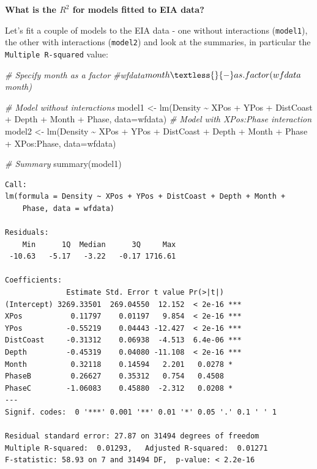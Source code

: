 \documentclass[
  oneside]{krantz}
\newenvironment{Shaded}{\begin{snugshade}}{\end{snugshade}}
\newcommand{\AttributeTok}[1]{\textcolor[rgb]{0.77,0.63,0.00}{#1}}
\newcommand{\CommentTok}[1]{\textcolor[rgb]{0.56,0.35,0.01}{\textit{#1}}}
\newcommand{\FunctionTok}[1]{\textcolor[rgb]{0.00,0.00,0.00}{#1}}
\newcommand{\NormalTok}[1]{#1}
\newcommand{\OtherTok}[1]{\textcolor[rgb]{0.56,0.35,0.01}{#1}}
\newcommand{\SpecialCharTok}[1]{\textcolor[rgb]{0.00,0.00,0.00}{#1}}
\begin{document}
\textbf{What is the \(R^2\) for models fitted to EIA data?}

Let's fit a couple of models to the EIA data - one without interactions (\texttt{model1}), the other with interactions (\texttt{model2}) and look at the summaries, in particular the \texttt{Multiple\ R-squared} value:

\begin{Shaded}
\begin{Highlighting}[]
\CommentTok{\# Specify month as a factor}
\CommentTok{\#wfdata$month \textless{}{-} as.factor(wfdata$month)}

\CommentTok{\# Model without interactions  }
\NormalTok{model1 }\OtherTok{\textless{}{-}} \FunctionTok{lm}\NormalTok{(Density }\SpecialCharTok{\textasciitilde{}}\NormalTok{ XPos }\SpecialCharTok{+}\NormalTok{ YPos }\SpecialCharTok{+}\NormalTok{ DistCoast }\SpecialCharTok{+}\NormalTok{ Depth }\SpecialCharTok{+}\NormalTok{ Month }\SpecialCharTok{+}\NormalTok{ Phase,}
              \AttributeTok{data=}\NormalTok{wfdata)}
\CommentTok{\# Model with XPos:Phase interaction}
\NormalTok{model2 }\OtherTok{\textless{}{-}} \FunctionTok{lm}\NormalTok{(Density }\SpecialCharTok{\textasciitilde{}}\NormalTok{ XPos }\SpecialCharTok{+}\NormalTok{ YPos }\SpecialCharTok{+}\NormalTok{ DistCoast }\SpecialCharTok{+}\NormalTok{ Depth }\SpecialCharTok{+}\NormalTok{ Month }\SpecialCharTok{+}\NormalTok{ Phase }\SpecialCharTok{+}
\NormalTok{               XPos}\SpecialCharTok{:}\NormalTok{Phase, }\AttributeTok{data=}\NormalTok{wfdata)}
\end{Highlighting}
\end{Shaded}

\normalsize

\begin{Shaded}
\begin{Highlighting}[]
\CommentTok{\# Summary}
\FunctionTok{summary}\NormalTok{(model1)}
\end{Highlighting}
\end{Shaded}

\begin{verbatim}
Call:
lm(formula = Density ~ XPos + YPos + DistCoast + Depth + Month + 
    Phase, data = wfdata)

Residuals:
    Min      1Q  Median      3Q     Max 
 -10.63   -5.17   -3.22   -0.17 1716.61 

Coefficients:
              Estimate Std. Error t value Pr(>|t|)    
(Intercept) 3269.33501  269.04550  12.152  < 2e-16 ***
XPos           0.11797    0.01197   9.854  < 2e-16 ***
YPos          -0.55219    0.04443 -12.427  < 2e-16 ***
DistCoast     -0.31312    0.06938  -4.513  6.4e-06 ***
Depth         -0.45319    0.04080 -11.108  < 2e-16 ***
Month          0.32118    0.14594   2.201   0.0278 *  
PhaseB         0.26627    0.35312   0.754   0.4508    
PhaseC        -1.06083    0.45880  -2.312   0.0208 *  
---
Signif. codes:  0 '***' 0.001 '**' 0.01 '*' 0.05 '.' 0.1 ' ' 1

Residual standard error: 27.87 on 31494 degrees of freedom
Multiple R-squared:  0.01293,   Adjusted R-squared:  0.01271 
F-statistic: 58.93 on 7 and 31494 DF,  p-value: < 2.2e-16
\end{verbatim}
\end{document}
